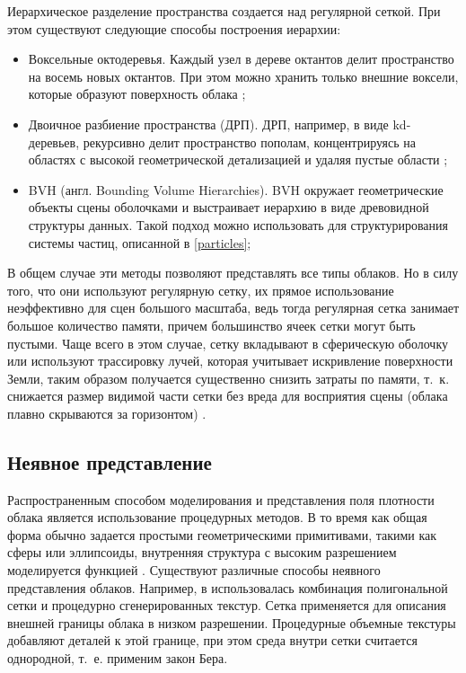 Иерархическое разделение пространства создается над регулярной сеткой. При этом существуют следующие способы построения иерархии:
\begin{itemize}
	\item Воксельные октодеревья. Каждый узел в дереве октантов делит пространство на восемь новых октантов. При этом можно хранить только внешние воксели, которые образуют поверхность облака \cite{clouds};
	\item Двоичное разбиение пространства (ДРП). ДРП, например, в виде kd-деревьев, рекурсивно делит пространство пополам, концентрируясь на областях с высокой геометрической детализацией и удаляя пустые области \cite{clouds};
	\item BVH (англ. Bounding Volume Hierarchies). BVH окружает геометрические объекты сцены оболочками и выстраивает иерархию в виде древовидной структуры данных. Такой подход можно использовать для структурирования системы частиц, описанной в \ref{particles};
\end{itemize}

 В общем случае эти методы позволяют представлять все типы облаков. Но в силу того, что они используют регулярную сетку, их прямое использование неэффективно для сцен большого масштаба, ведь тогда регулярная сетка занимает большое количество памяти, причем большинство ячеек сетки могут быть пустыми. Чаще всего в этом случае, сетку вкладывают в сферическую оболочку или используют трассировку лучей, которая учитывает искривление поверхности Земли, таким образом получается существенно снизить затраты по памяти, т.~к. снижается размер видимой части сетки без вреда для восприятия сцены (облака плавно скрываются за горизонтом) \cite{clouds}.


\subsection{Неявное представление} 

Распространенным способом моделирования и представления поля плотности облака является использование процедурных методов. В то время как общая форма обычно задается простыми геометрическими примитивами, такими как сферы или эллипсоиды, внутренняя структура с высоким разрешением моделируется функцией \cite{clouds}. Существуют различные способы неявного представления облаков. Например, в \cite{implicit} использовалась комбинация полигональной сетки и процедурно сгенерированных текстур. Сетка применяется для описания внешней границы облака в низком разрешении. Процедурные объемные текстуры добавляют деталей к этой границе, при этом среда внутри сетки считается однородной, т.~е. применим закон Бера.

